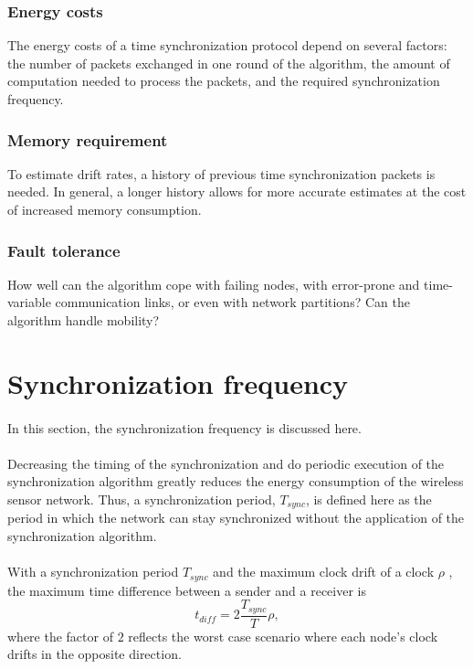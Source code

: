 \documentclass[a4paper,10pt]{report}
\begin{document}
\subsubsection{\textbf{Energy costs}}
The energy costs of a time synchronization protocol depend on several factors: the number of packets exchanged in one round of the algorithm, the amount of computation needed to process the packets, and the required synchronization frequency.
\subsubsection{\textbf{Memory requirement}}
To estimate drift rates, a history of previous time synchronization packets is needed. In general, a longer history allows for more accurate estimates at the cost of increased memory consumption.
\subsubsection{\textbf{Fault tolerance}}
How well can the algorithm cope with failing nodes, with error-prone and time-variable communication links, or even with network partitions? Can the algorithm handle mobility?
\section{\textbf{Synchronization frequency}}\paragraph*{}
In this section, the synchronization frequency is discussed here. 
\paragraph*{} Decreasing the timing of the synchronization and do periodic execution of the synchronization algorithm greatly reduces
the energy consumption of the wireless sensor network. Thus, a synchronization period, $T_{sync}$, is defined here as the period in which the network can stay synchronized without the application of the synchronization algorithm.
\paragraph*{}
With a synchronization period $T_{sync}$ and the maximum clock drift of a clock $\rho$ , the maximum time difference between a sender and a receiver is
\begin{equation}
t_{diff} = 2\frac{T_{sync}}{T}\rho ,
\end{equation}
where the factor of $2$ reflects the worst case scenario where each node's clock drifts in the opposite direction.
\end{document}
